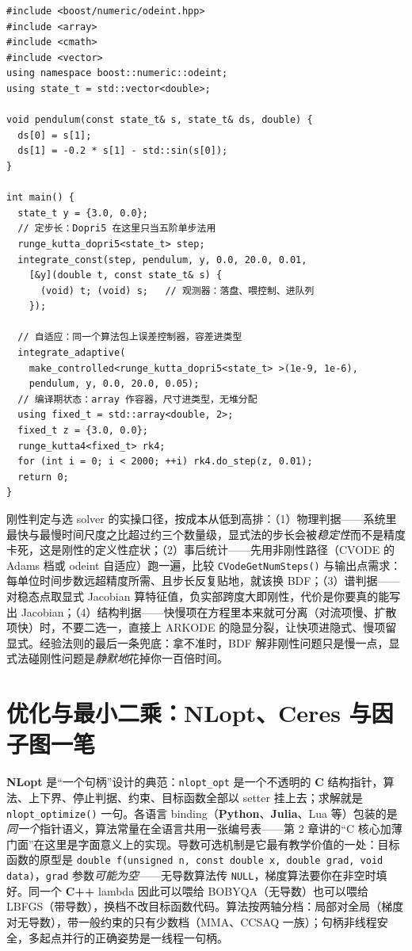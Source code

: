 \documentclass[12pt,a4paper,fontset=fandol]{ctexbook}
\newcommand{\Fn}[1]{\texttt{#1()}}
\newcommand{\Tp}[1]{\texttt{#1}}
\newcommand{\Lib}[1]{\textbf{#1}}
\newcommand{\Lang}[1]{\textsf{\bfseries #1}}
\newcommand{\CL}{\Lang{C}}
\newcommand{\CPP}{\Lang{C++}}
\newcommand{\PY}{\Lang{Python}}
\begin{document}
\begin{lstlisting}[style=cppstyle,caption={Boost.Odeint：\Tp{integrate\_const} 配 \Tp{runge\_kutta\_dopri5}，同一段右端函数接两种驱动},label={lst:ch07-odeint}]
#include <boost/numeric/odeint.hpp>
#include <array>
#include <cmath>
#include <vector>
using namespace boost::numeric::odeint;
using state_t = std::vector<double>;

void pendulum(const state_t& s, state_t& ds, double) {
  ds[0] = s[1];
  ds[1] = -0.2 * s[1] - std::sin(s[0]);
}

int main() {
  state_t y = {3.0, 0.0};
  // 定步长：Dopri5 在这里只当五阶单步法用
  runge_kutta_dopri5<state_t> step;
  integrate_const(step, pendulum, y, 0.0, 20.0, 0.01,
    [&y](double t, const state_t& s) {
      (void) t; (void) s;   // 观测器：落盘、喂控制、进队列
    });

  // 自适应：同一个算法包上误差控制器，容差进类型
  integrate_adaptive(
    make_controlled<runge_kutta_dopri5<state_t> >(1e-9, 1e-6),
    pendulum, y, 0.0, 20.0, 0.05);
  // 编译期状态：array 作容器，尺寸进类型，无堆分配
  using fixed_t = std::array<double, 2>;
  fixed_t z = {3.0, 0.0};
  runge_kutta4<fixed_t> rk4;
  for (int i = 0; i < 2000; ++i) rk4.do_step(z, 0.01);
  return 0;
}
\end{lstlisting}

刚性判定与选 solver 的实操口径，按成本从低到高排：（1）物理判据——系统里最快与最慢时间尺度之比超过约三个数量级，显式法的步长会被\emph{稳定性}而不是精度卡死，这是刚性的定义性症状；（2）事后统计——先用非刚性路径（CVODE 的 Adams 档或 odeint 自适应）跑一遍，比较 \Fn{CVodeGetNumSteps} 与输出点需求：每单位时间步数远超精度所需、且步长反复贴地，就该换 BDF；（3）谱判据——对稳态点取显式 Jacobian 算特征值，负实部跨度大即刚性，代价是你要真的能写出 Jacobian；（4）结构判据——快慢项在方程里本来就可分离（对流项慢、扩散项快）时，不要二选一，直接上 ARKODE 的隐显分裂，让快项进隐式、慢项留显式。经验法则的最后一条兜底：拿不准时，BDF 解非刚性问题只是慢一点，显式法碰刚性问题是\emph{静默地}花掉你一百倍时间。

\section{优化与最小二乘：NLopt、Ceres 与因子图一笔}\label{sec:ch07-opt}

\Lib{NLopt} 是``一个句柄''设计的典范：\Tp{nlopt\_opt} 是一个不透明的 \CL{} 结构指针，算法、上下界、停止判据、约束、目标函数全部以 setter 挂上去；求解就是 \Fn{nlopt\_optimize} 一句。各语言 binding（\PY{}、\Lang{Julia}、Lua 等）包装的是\emph{同一个}指针语义，算法常量在全语言共用一张编号表——第 2 章讲的``C 核心加薄门面''在这里是字面意义上的实现。导数可选机制是它最有教学价值的一处：目标函数的原型是 \Tp{double f(unsigned n, const double\* x, double\* grad, void\* data)}，\Tp{grad} 参数\emph{可能为空}——无导数算法传 \Tp{NULL}，梯度算法要你在非空时填好。同一个 \CPP{} lambda 因此可以喂给 BOBYQA（无导数）也可以喂给 LBFGS（带导数），换档不改目标函数代码。算法按两轴分档：局部对全局（梯度对无导数），带一般约束的只有少数档（MMA、CCSAQ 一族）；句柄非线程安全，多起点并行的正确姿势是一线程一句柄。
\end{document}
